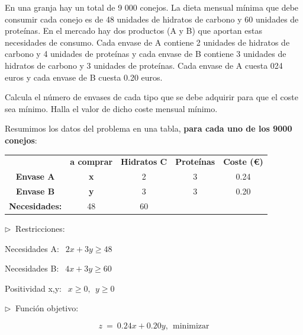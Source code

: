 \vspace{10mm}
\begin{ejemplo}
\begin{ejer}
	En una granja hay un total de 9 000 conejos. La dieta mensual mínima que debe consumir cada conejo es de 48 unidades de hidratos de carbono y 60 unidades de proteínas. En el mercado hay dos productos (A y B) que aportan estas necesidades de consumo. Cada envase de A contiene 2 unidades de hidratos de carbono y 4 unidades de proteínas y cada envase de B contiene 3 unidades de hidratos de carbono y 3 unidades de proteínas. Cada envase de A cuesta 024 euros y cada envase de B cuesta 0.20 euros.
	
Calcula el número de envases de cada tipo que se debe adquirir para que el coste sea mínimo. Halla el valor de dicho coste mensual mínimo.
\end{ejer}	
\end{ejemplo}
\vspace{5mm}

Resumimos los datos del problema en una tabla, \textbf{para cada uno de los 9000 conejos}:

\begin{table}[H]
\centering
\begin{tabular}{ccccc}
 & \textbf{a comprar} & \textbf{Hidratos C} & \textbf{Proteínas} & \textbf{Coste (\euro)} \\ \cline{2-5} 
\textbf{Envase A} & \textbf{x} & 2 & 3 & 0.24 \\
\textbf{Envase B} & \textbf{y} & 3 & 3 & 0.20 \\ \cline{2-3}
\textbf{Necesidades:} & 48 & 60 &  & 
\end{tabular}
\end{table}

\begin{multicols}{2}
$\triangleright \ $ Restricciones:

Necesidades A: $\ \ 2x+3y\ge 48$

Necesidades B: $\ \ 4x+3y\ge 60$	

Positividad x,y: $\ \ x\ge 0,\ \ y\ge 0$

$\triangleright \ $ Función objetivo:

$$z\ = \ 0.24x+0.20y,\ \ \text{minimizar}$$

$\, $
\end{multicols}

